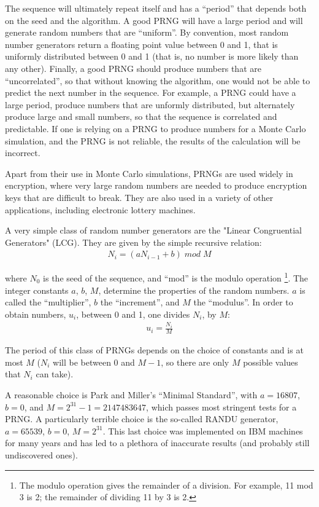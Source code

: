 The sequence will ultimately repeat itself and has a ``period'' that depends both on the seed and the algorithm. A good PRNG will have a large period and will generate random numbers that are ``uniform''. By convention, most random number generators return a floating point value between 0 and 1, that is uniformly distributed between 0 and 1 (that is, no number is more likely than any other). Finally, a good PRNG should produce numbers that are ``uncorrelated'', so that without knowing the algorithm, one would not be able to predict the next number in the sequence. For example, a PRNG could have a large period, produce numbers that are unformly distributed, but alternately produce large and small numbers, so that the sequence is correlated and predictable. If one is relying on a PRNG to produce numbers for a Monte Carlo simulation, and the PRNG is not reliable, the results of the calculation will be incorrect.

Apart from their use in Monte Carlo simulations, PRNGs are used widely in encryption, where very large random numbers are needed to produce encryption keys that are difficult to break. They are also used in a variety of other applications, including electronic lottery machines.

A very simple class of random number generators are the "Linear Congruential Generators" (LCG). They are given by the simple recursive relation:
\begin{align*}
 N_i = (aN_{i-1} + b) \; mod \; M 
\end{align*}

where $N_0$ is the seed of the sequence, and ``mod'' is the modulo operation \footnote{The modulo operation gives the remainder of a division. For example, 11 mod 3 is 2; the remainder of dividing 11 by 3 is 2.}. The integer constants $a$, $b$, $M$, determine the properties of the random numbers. $a$ is called the ``multiplier'', $b$ the ``increment'', and $M$ the ``modulus''. In order to obtain numbers, $u_i$, between 0 and 1, one divides $N_i$, by $M$:
\begin{align*}
 u_i = \frac{N_i}{M}
\end{align*}

The period of this class of PRNGs depends on the choice of constants and is at most $M$ ($N_i$ will be between 0 and $M-1$, so there are only $M$ possible values that $N_i$ can take).

A reasonable choice is Park and Miller's ``Minimal Standard'', with $a=16807$, $b=0$, and $M=2^{31}-1=2147483647$, which passes most stringent tests for a PRNG. A particularly terrible choice is the so-called RANDU generator, $a=65539$, $b=0$, $M=2^{31}$. This last choice was implemented on IBM machines for many years and has led to a plethora of inaccurate results (and probably still undiscovered ones).  

